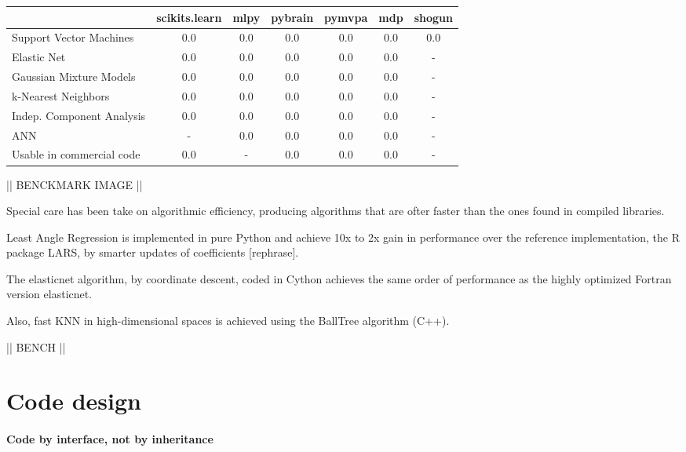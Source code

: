 \documentclass[twoside,11pt]{article}
\begin{document}
\begin{center}


\begin{tabular}{l c c c c c c}
\hline\hline %
 & scikits.learn & mlpy & pybrain & pymvpa &  mdp & shogun \\ [0.5ex]
\hline
Support Vector Machines        & 0.0 & 0.0   & 0.0       &  0.0     & 0.0    & 0.0 \\
Elastic Net & 0.0 & 0.0   & 0.0       &  0.0     & 0.0    & - \\
Gaussian Mixture Models  & 0.0 & 0.0   & 0.0       &  0.0     & 0.0    & - \\
k-Nearest Neighbors & 0.0 & 0.0   & 0.0       &  0.0     & 0.0    & - \\
Indep. Component Analysis & 0.0 & 0.0  & 0.0  & 0.0  & 0.0  & - \\
ANN  & - & 0.0  & 0.0  & 0.0  & 0.0  & - \\
Usable in commercial code &  0.0 & -   & 0.0       &  0.0     & 0.0    & - \\
\hline
\end{tabular}

\end{center}



|| BENCKMARK IMAGE ||


Special care has been take on algorithmic efficiency, producing
algorithms that are ofter faster than the ones found in compiled
libraries.

Least Angle Regression is implemented in pure Python and achieve 10x
to 2x gain in performance over the reference implementation, the R
package LARS, by smarter updates of coefficients [rephrase].


The elasticnet algorithm, by coordinate descent, coded in Cython
achieves the same order of performance as the highly optimized Fortran
version elasticnet.

Also, fast KNN in high-dimensional spaces is achieved using the
BallTree algorithm (C++).

|| BENCH ||

\section{Code design}

\paragraph{Code by interface, not by inheritance}
%
\end{document}
